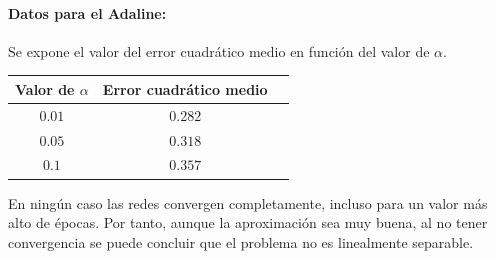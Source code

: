 \documentclass[spanish]{assignment}
\begin{document}
	\paragraph{Datos para el Adaline:} Se expone el valor del error cuadrático medio en función del valor de $\alpha$.
	\begin{center}
		\begin{tabular}{|c|c|c|}
			\hline
			\textbf{Valor de $\alpha$} & \textbf{Error cuadrático medio}\\
			\hline
			$0.01$  & $0.282$\\
			$0.05$ & $0.318$\\
			$0.1$  & $0.357$\\
			\hline
		\end{tabular}
	\end{center}
	
	En ningún caso las redes convergen completamente, incluso para un valor más alto de épocas. Por tanto, aunque la aproximación sea muy buena, al no tener convergencia se puede concluir que el problema no es linealmente separable.
	
\end{document}
